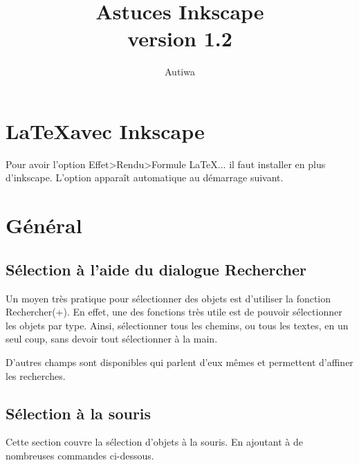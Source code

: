 \documentclass[a4paper,twoside]{article}
\title{Astuces Inkscape\\version 1.2}
\author{Autiwa}
\begin{document}

\tableofcontents
\newpage


\section[LaTeX avec Inkscape]{\LaTeX avec Inkscape}
Pour avoir l'option Effet>Rendu>Formule LaTeX... il faut installer  en plus d'inkscape. L'option apparaît automatique au démarrage suivant.

\section{Général}
\subsection{Sélection à l'aide du dialogue Rechercher}
Un moyen très pratique pour sélectionner des objets est d'utiliser la fonction \og Rechercher\fg (+). En effet, une des fonctions très utile est de pouvoir sélectionner les objets par type. Ainsi, sélectionner tous les chemins, ou tous les textes, en un seul coup, sans devoir tout sélectionner à la main.

D'autres champs sont disponibles qui parlent d'eux mêmes et permettent d'affiner les recherches.

\subsection{Sélection à la souris}
Cette section couvre la sélection d'objets à la souris. En ajoutant  à de nombreuses commandes ci-dessous. 
\end{document}
